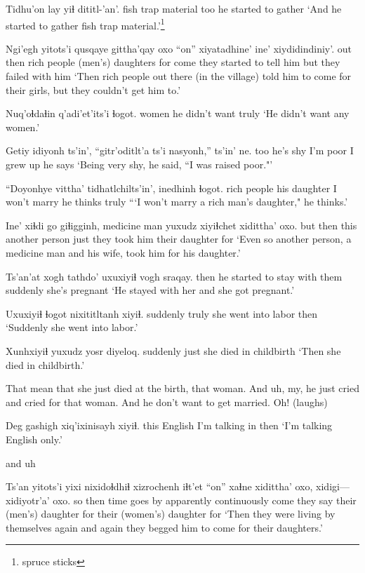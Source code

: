 \documentclass[12pt]{article}
\begin{document}
\gll Tidhu'on  lay     yiɬ dititl-'an'.
{fish trap} material too {he started to gather}
\glt `And he started to gather fish trap material.'\footnote{spruce sticks}
\glend

\gll Ngi'egh yitots'i qusqaye      gittha'qay oxo ``on''    xiyatadhine' ine' xiydidindiniy'.
out     then       {rich people} {(men's) daughters}  for come  {they started to tell him}  but  {they failed with him}
\glt `Then rich people out there (in the village) told him to come for their girls, but they couldn't get him to.'
\glend

\gll       Nuq'oɬdaɬin q'adi'et'its'i ɬogot.
  women       {he didn't want} truly
\glt `He didn't want any women.'
\glend

\gll Getiy idiyonh ts'in', ``gitr'oditlt'a ts'i  nasyonh,''   ts'in' ne.
too  {he's shy} {}  {I'm poor}  {} {I grew up}  {} {he says}
\glt `Being very shy, he said, ``I was raised poor."'
\glend

\gll ``Doyonhye    vittha'      {tidhatlchilts'in',} inedhinh ɬogot.
{rich people} {his daughter} {I won't marry}   {he thinks} truly
\glt ```I won't marry a rich man's daughter," he thinks.'
\glend

\gll Ine'   xiɬdi go   giɬigginh,       {medicine man} yuxudz xiyiɬchet     xidittha'      oxo.
but then  this {another person} {}      just   {they took him} {their daughter} for
\glt `Even so another person, a medicine man and his wife, took him for his daughter.'
\glend

\gll Ts'an'at {xogh tathdo'}                 uxuxiyiɬ   {vogh sraqay}.
then     {he started to stay with them} suddenly {she's pregnant}
\glt `He stayed with her and she got pregnant.'        
\glend

\gll Uxuxiyiɬ ɬogot  nixititltanh          xiyiɬ. 
suddenly truly  {she went into labor} then
\glt `Suddenly she went into labor.'
\glend

\gll Xunhxiyiɬ yuxudz {yosr diyeloq}.
suddenly  just   {she died in childbirth}
\glt `Then she died in childbirth.'
\glend

That mean that she just died at the birth, that woman. And uh, my, he
just cried and cried for that woman. And he don't want to get married.
Oh! (laughs)

\gll Deg  gashigh xiq'ixinisayh  xiyiɬ. 
this English {I'm talking in} then
\glt `I'm talking English only.'
\glend

and uh

\gll Ts'an yitots'i {yixi nixidoɬdhiɬ} xizrochenh iɬt'et ``on''   xaɬne    xidittha'              oxo, xidigi--- xidiyotr'a'               oxo.
so    then      {time goes by}        apparently         continuously come {they say} {their (men's) daughter} for  {} {their (women's) daughter} for 
\glt `Then they were living by themselves again and again they begged him to come for their daughters.'
\glend
\end{document}
